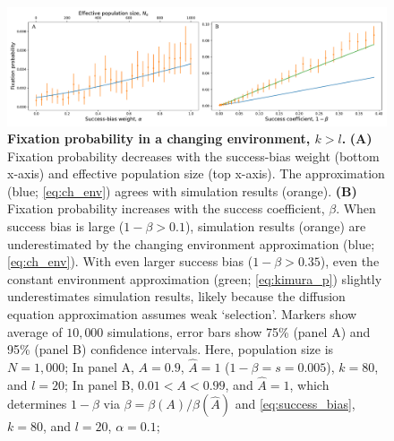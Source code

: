 \documentclass[12pt]{extarticle}
\begin{document}
\begin{figure}
	\centering
    \includegraphics[width=\linewidth]{ch_env_k_large.pdf}
  \caption{\textbf{Fixation probability in a changing environment, $k>l$.}
\textbf{(A)} Fixation probability decreases with {the} success-bias weight (bottom x-axis) and effective population size (top x-axis). The approximation (blue; \cref{eq:ch_env}) agrees with simulation results (orange). 
\textbf{(B)} Fixation probability increases with the success coefficient, $\beta$.
When success bias is large ($1-\beta > 0.1$),  
simulation results (orange) are underestimated by the changing environment approximation (blue; \cref{eq:ch_env}). With even larger success bias ($1-\beta > 0.35$), even the constant environment approximation (green; \cref{eq:kimura_p}) slightly underestimates simulation results, likely because the diffusion equation approximation assumes weak `selection'.
Markers show average of $10,000$ simulations, error bars show 75\% (panel A) and 95\% (panel B) confidence intervals.
Here, population size is $N=1,000$;
In panel A, $A=0.9$, $\hat{A}=1$ ($1-\beta=s=0.005$), $k=80$, and $l=20$;
In panel B, $0.01 < A< 0.99$, and $\hat{A}=1$, which determines $1-\beta$ via $\beta = \beta(A)/\beta(\hat{A})$ and \cref{eq:success_bias}, $k=80$, and $l=20$, $\alpha=0.1$; 
}
\label{fig:ch_env_alpha_beta_k_large}
\end{figure}
\end{document}
